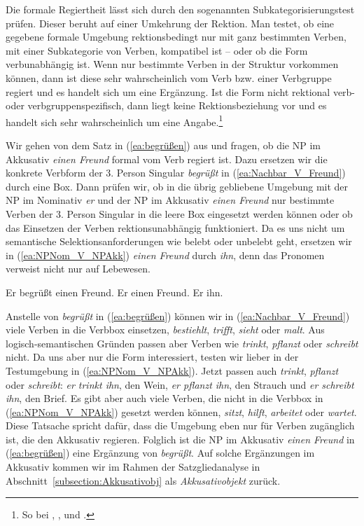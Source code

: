 Die formale Regiertheit lässt sich durch den sogenannten Subkategorisierungstest prüfen. Dieser beruht auf einer Umkehrung der Rektion. Man testet, ob eine gegebene formale Umgebung rektionsbedingt nur mit ganz bestimmten Verben, mit einer Subkategorie von Verben, kompatibel ist -- oder ob die Form verbunabhängig ist. Wenn nur bestimmte Verben in der Struktur vorkommen können, dann ist diese sehr wahrscheinlich vom Verb bzw. einer Verbgruppe regiert und es handelt sich um eine Ergänzung. Ist die Form nicht rektional verb- oder verbgruppenspezifisch, dann liegt keine Rektionsbeziehung vor und es handelt sich sehr wahrscheinlich um eine Angabe.\footnote{So \ua bei \citet[72]{Helbig1992b}, \citet[65]{Jacobs1994}, \citet[99]{Engel2009} und \citet[53]{Welke2011}.}
 
Wir gehen von dem Satz in (\ref{ea:begrüßen}) aus und fragen, ob die NP im Akkusativ \textit{einen Freund} formal vom Verb regiert ist. Dazu ersetzen wir die konkrete Verbform der 3. Person Singular \textit{begrüßt} in (\ref{ea:Nachbar_V_Freund}) durch eine Box. Dann prüfen wir, ob in die übrig gebliebene Umgebung mit der NP im Nominativ \textit{er} und der NP im Akkusativ \textit{einen Freund} nur bestimmte Verben der 3. Person Singular in die leere Box eingesetzt werden können oder ob das Einsetzen der Verben rektionsunabhängig funktioniert. Da es uns nicht um semantische Selektionsanforderungen wie belebt oder unbelebt geht, ersetzen wir in (\ref{ea:NPNom_V_NPAkk}) \textit{einen Freund} durch \textit{ihn}, denn das Pronomen verweist nicht nur auf Lebewesen.   

\ea \label{ea:Subkategorisierungstest}
\ea \label{ea:begrüßen} Er begrüßt einen Freund.
\ex \label{ea:Nachbar_V_Freund} Er \fbox{\phantom{begrüßt}} einen Freund.
\ex \label{ea:NPNom_V_NPAkk} Er \fbox{\phantom{begrüßt}} ihn.
\z 
\z   

Anstelle von \textit{begrüßt} in (\ref{ea:begrüßen}) können wir in (\ref{ea:Nachbar_V_Freund}) viele Verben in die Verbbox einsetzen, \zB \textit{bestiehlt}, \textit{trifft}, \textit{sieht} oder \textit{malt}. Aus logisch-semantischen Gründen passen aber Verben wie \textit{trinkt}, \textit{pflanzt} oder \textit{schreibt} nicht. Da uns aber nur die Form interessiert, testen wir lieber in der Testumgebung in (\ref{ea:NPNom_V_NPAkk}). Jetzt passen auch \textit{trinkt}, \textit{pflanzt} oder \textit{schreibt}: \textit{er trinkt ihn}, \zB den Wein, \textit{er pflanzt ihn}, \zB den Strauch und \textit{er schreibt ihn}, \zB den Brief. Es gibt aber auch viele Verben, die nicht in die Verbbox in (\ref{ea:NPNom_V_NPAkk}) gesetzt werden können, \zB \textit{sitzt}, \textit{hilft}, \textit{arbeitet} oder \textit{wartet}. Diese Tatsache spricht dafür, dass die Umgebung eben nur für Verben zugänglich ist, die den Akkusativ regieren. Folglich ist die NP im Akkusativ \textit{einen Freund} in (\ref{ea:begrüßen}) eine Ergänzung von \textit{begrüßt}. Auf solche Ergänzungen im Akkusativ kommen wir im Rahmen der Satzgliedanalyse in Abschnitt~\ref{subsection:Akkusativobj} als \textit{Akkusativobjekt} zurück.

